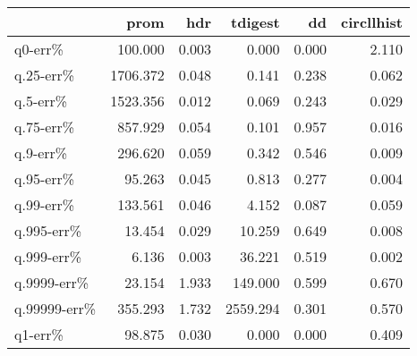 \begin{tabular}{lrrrrr}
\toprule
{} &     prom &   hdr &  tdigest &    dd &  circllhist \\
\midrule
q0-err\%      &  100.000 & 0.003 &    0.000 & 0.000 &       2.110 \\
q.25-err\%    & 1706.372 & 0.048 &    0.141 & 0.238 &       0.062 \\
q.5-err\%     & 1523.356 & 0.012 &    0.069 & 0.243 &       0.029 \\
q.75-err\%    &  857.929 & 0.054 &    0.101 & 0.957 &       0.016 \\
q.9-err\%     &  296.620 & 0.059 &    0.342 & 0.546 &       0.009 \\
q.95-err\%    &   95.263 & 0.045 &    0.813 & 0.277 &       0.004 \\
q.99-err\%    &  133.561 & 0.046 &    4.152 & 0.087 &       0.059 \\
q.995-err\%   &   13.454 & 0.029 &   10.259 & 0.649 &       0.008 \\
q.999-err\%   &    6.136 & 0.003 &   36.221 & 0.519 &       0.002 \\
q.9999-err\%  &   23.154 & 1.933 &  149.000 & 0.599 &       0.670 \\
q.99999-err\% &  355.293 & 1.732 & 2559.294 & 0.301 &       0.570 \\
q1-err\%      &   98.875 & 0.030 &    0.000 & 0.000 &       0.409 \\
\bottomrule
\end{tabular}
